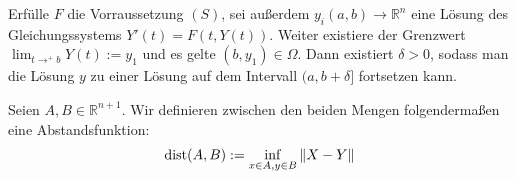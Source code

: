 \documentclass{report}
\newcommand{\bR}{\mathbb{R}}
\begin{document}
\clearpage
[...]
\clearpage
\begin{lemma}
 Erfülle $F$ die Vorraussetzung $(S)$, sei außerdem $y_i (a,b) \to \bR^n$ eine Lösung des Gleichungssystems $Y'(t) = F(t,Y(t))$. Weiter existiere der Grenzwert $\lim_{t \to^+ b} Y(t) := y_1$ und es gelte $(b,y_1) \in \Omega$. Dann existiert $\delta > 0$, sodass man die Lösung $y$ zu einer Lösung auf dem Intervall $(a, b+\delta]$ fortsetzen kann.
\end{lemma}
\begin{definition}
 Seien $A,B \in \bR^{n+1}$. Wir definieren zwischen den beiden Mengen folgendermaßen eine Abstandsfunktion: \begin{align*}
  \text{dist}(A,B) := \inf_{x \in A, y \in B} \norm{X - Y}                                                                                                   
 \end{align*}
\end{definition}

%
%
%
%
%
%
%
%
%
%
%
\end{document}
